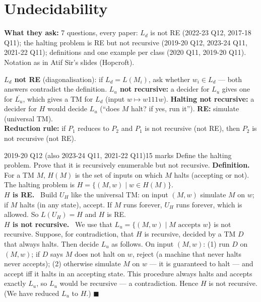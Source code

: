\documentclass[10.5pt,a4paper]{article}
\newcommand{\asked}[1]{{\small\color{gray!60!black}\textbf{What they ask:} #1}\par}
\newcommand{\ansh}[1]{\textbf{\color{exborder}#1}\ }
\begin{document}
\section{Undecidability}
\asked{7 questions, every paper: $L_d$ is not RE (2022-23 Q12, 2017-18 Q11); the halting problem is RE but not recursive (2019-20 Q12,
2023-24 Q11, 2021-22 Q11); definitions and one example per class (2020 Q11, 2019-20 Q11). Notation as in Atif Sir's slides (Hopcroft).}
\begin{recipe}
\textbf{$L_d$ not RE} (diagonalisation): if $L_d=L(M_i)$, ask whether $w_i\in L_d$ --- both answers contradict the definition.
\textbf{$L_u$ not recursive:} a decider for $L_u$ gives one for $\overline{L_u}$, which gives a TM for $L_d$ (input $w\mapsto w111w$).
\textbf{Halting not recursive:} a decider for $H$ would decide $L_u$ (``does $M$ halt? if yes, run it''). \textbf{RE:} simulate (universal TM).\\
\textbf{Reduction rule:} if $P_1$ reduces to $P_2$ and $P_1$ is not recursive (not RE), then $P_2$ is not recursive (not RE).
\end{recipe}

\begin{examq}{2019-20 Q12 (also 2023-24 Q11, 2021-22 Q11)}{15 marks}
Define the halting problem. Prove that it is recursively enumerable but not recursive.
\tcblower
\ansh{Definition.} For a TM $M$, $H(M)$ is the set of inputs on which $M$ halts (accepting or not). The halting problem is
$H=\{(M,w)\mid w\in H(M)\}$.\\
\ansh{$H$ is RE.} Build $U_H$ like the universal TM: on input $(M,w)$ simulate $M$ on $w$; if $M$ halts (in any state), accept. If $M$ runs
forever, $U_H$ runs forever, which is allowed. So $L(U_H)=H$ and $H$ is RE.\\
\ansh{$H$ is not recursive.} We use that $L_u=\{(M,w)\mid M\text{ accepts }w\}$ is not recursive. Suppose, for contradiction, that $H$ is
recursive, decided by a TM $D$ that always halts. Then decide $L_u$ as follows. On input $(M,w)$:
(1) run $D$ on $(M,w)$; if $D$ says $M$ does not halt on $w$, reject (a machine that never halts never accepts);
(2) otherwise simulate $M$ on $w$ --- it is guaranteed to halt --- and accept iff it halts in an accepting state.
This procedure always halts and accepts exactly $L_u$, so $L_u$ would be recursive --- a contradiction. Hence $H$ is not recursive.
(We have reduced $L_u$ to $H$.) $\blacksquare$
\end{examq}
\end{document}
